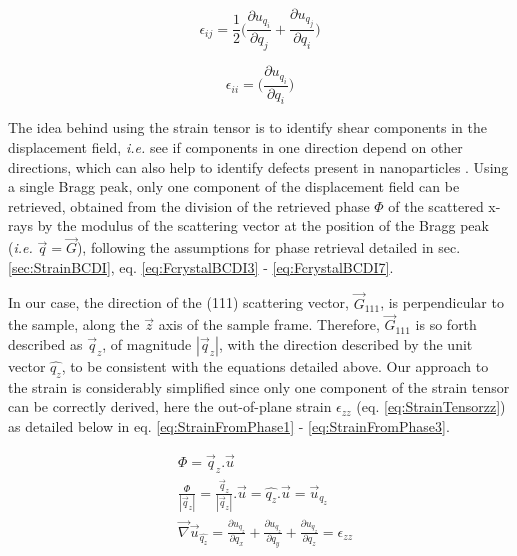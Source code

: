 \begin{equation}
  \epsilon_{ij} = \frac{1}{2}
    \Bigg(
    \frac{\partial u_{q_i}}{\partial q_j}
    +
    \frac{\partial u_{q_j}}{\partial q_i}
    \Bigg)
    \label{eq:StrainTensorIJ}
\end{equation}

\begin{equation}
  \epsilon_{ii} =
    \Bigg(
    \frac{\partial u_{q_i}}{\partial q_i}
    \Bigg)
    \label{eq:StrainTensorzz}
\end{equation}

The idea behind using the strain tensor is to identify shear components in the displacement field, \textit{i.e.} see if components in one direction depend on other directions, which can also help to identify defects present in nanoparticles \parencite{Lauraux2021}.
Using a single Bragg peak, only one component of the displacement field can be retrieved, obtained from the division of the retrieved phase $\Phi$ of the scattered x-rays by the modulus of the scattering vector at the position of the Bragg peak (\textit{i.e.} $\vec{q} = \vec{G}$), following the assumptions for phase retrieval detailed in sec. \ref{sec:StrainBCDI}, eq. \ref{eq:FcrystalBCDI3} - \ref{eq:FcrystalBCDI7}.

In our case, the direction of the (111) scattering vector, $\vec{G}_{111}$, is perpendicular to the sample, along the $\vec{z}$ axis of the sample frame.
Therefore, $\vec{G}_{111}$ is so forth described as $\vec{q}_z$, of magnitude  $|\vec{q}_z|$, with the direction described by the unit vector  $\hat{q_z}$, to be consistent with the equations detailed above.
Our approach to the strain is considerably simplified since only one component of the strain tensor can be correctly derived, here the out-of-plane strain $\epsilon_{zz}$ (eq. \ref{eq:StrainTensorzz}) as detailed below in eq. \ref{eq:StrainFromPhase1} - \ref{eq:StrainFromPhase3}.

\begin{align}
    \label{eq:StrainFromPhase1}
    & \Phi =  \vec{q}_z.\vec{u} \\
    \label{eq:StrainFromPhase2}
    & \frac{\Phi}{|\vec{q}_z|} = \frac{\vec{q}_z}{|\vec{q}_z|}.\vec{u} = \hat{q_z}.\vec{u} = \vec{u}_{q_z} \\
    \label{eq:StrainFromPhase3}
    & \vec{\nabla} \vec{u}_{\hat{q_z}} = \frac{\partial u_{q_z}}{\partial q_x} +  \frac{\partial u_{q_z}}{\partial q_y} +  \frac{\partial u_{q_z}}{\partial q_z} = \epsilon_{zz}
\end{align}


